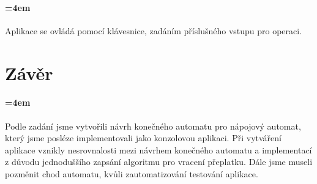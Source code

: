\documentclass[12pt,a4paper]{article}
\begin{document}
\paragraph{\parindent=4em}{	
	Aplikace se ovládá pomocí klávesnice, zadáním příslušného vstupu pro operaci.
}

\newpage
\section{Závěr}

\paragraph{\parindent=4em}{	
	Podle zadání jsme vytvořili návrh konečného automatu pro nápojový automat, který jsme posléze implementovali jako konzolovou aplikaci. Při vytváření aplikace vznikly nesrovnalosti mezi návrhem konečného automatu a implementací z důvodu jednoduššího zapsání algoritmu pro vracení přeplatku. Dále jsme museli pozměnit chod automatu, kvůli zautomatizování testování aplikace.
}

%
%
\end{document}
